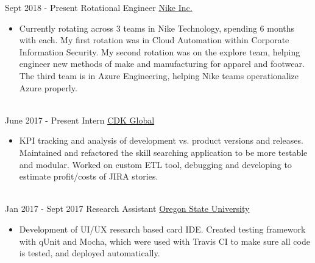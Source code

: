 \documentclass[letterpaper]{twentysecondcv} %
\begin{document}
\begin{twenty} %
\twentyitem
    	{Sept 2018 -}
		{Present}
        {Rotational Engineer}
        {\href{https://www.nike.com/}{Nike Inc.}}
        {}
        {\begin{itemize}
        \item Currently rotating across 3 teams in Nike Technology, spending 6 months with each. My first rotation was in Cloud Automation within Corporate Information Security. My second rotation was on the explore team, helping engineer new methods of make and manufacturing for apparel and footwear. The third team is in Azure Engineering, helping Nike teams operationalize Azure properly.
        \end{itemize}}
        \\

\twentyitem
    	{June 2017 -}
		{Present}
        {Intern}
        {\href{https://www.cdkglobal.com/}{CDK Global}}
        {}
        {\begin{itemize}
        \item KPI tracking and analysis of development vs. product versions and releases. Maintained and refactored the skill searching application to be more testable and modular. Worked on custom ETL tool, debugging and developing to estimate profit/costs of JIRA stories. 
        \end{itemize}}
        \\
	\twentyitem
    	{Jan 2017 -}
		{Sept 2017}
        {Research Assistant}
        {\href{http://www.oregonstate.edu}{Oregon State University}}
        {}
        {
        {\begin{itemize}
        \item Development of UI/UX research based card IDE. Created testing framework with qUnit and Mocha, which were used with Travis CI to make sure all code is tested, and deployed automatically. 
    \end{itemize}}
    	}
\end{twenty}
\end{document}
